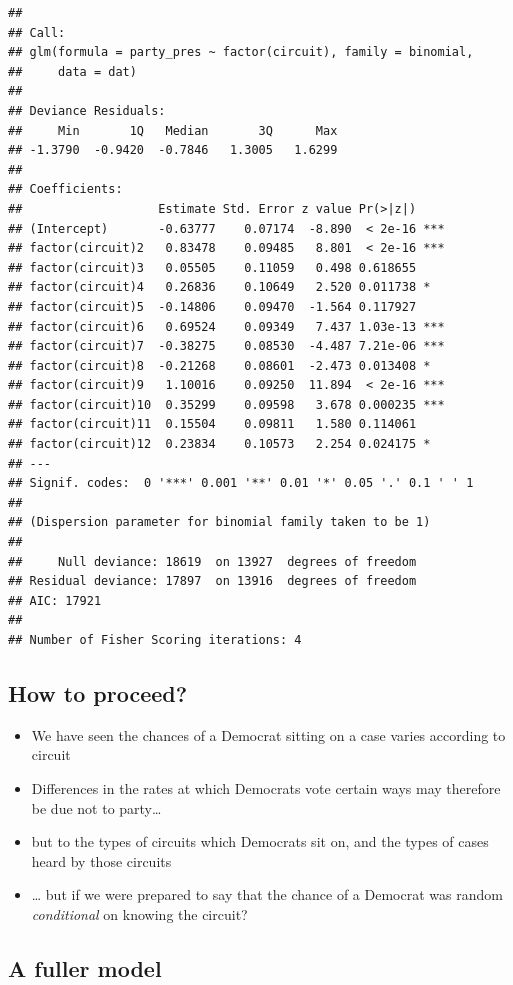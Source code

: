 \documentclass[12pt,twoside]{article}
\providecommand{\tightlist}{%
  \setlength{\itemsep}{0pt}\setlength{\parskip}{0pt}}
\begin{document}
\begin{verbatim}
## 
## Call:
## glm(formula = party_pres ~ factor(circuit), family = binomial, 
##     data = dat)
## 
## Deviance Residuals: 
##     Min       1Q   Median       3Q      Max  
## -1.3790  -0.9420  -0.7846   1.3005   1.6299  
## 
## Coefficients:
##                   Estimate Std. Error z value Pr(>|z|)    
## (Intercept)       -0.63777    0.07174  -8.890  < 2e-16 ***
## factor(circuit)2   0.83478    0.09485   8.801  < 2e-16 ***
## factor(circuit)3   0.05505    0.11059   0.498 0.618655    
## factor(circuit)4   0.26836    0.10649   2.520 0.011738 *  
## factor(circuit)5  -0.14806    0.09470  -1.564 0.117927    
## factor(circuit)6   0.69524    0.09349   7.437 1.03e-13 ***
## factor(circuit)7  -0.38275    0.08530  -4.487 7.21e-06 ***
## factor(circuit)8  -0.21268    0.08601  -2.473 0.013408 *  
## factor(circuit)9   1.10016    0.09250  11.894  < 2e-16 ***
## factor(circuit)10  0.35299    0.09598   3.678 0.000235 ***
## factor(circuit)11  0.15504    0.09811   1.580 0.114061    
## factor(circuit)12  0.23834    0.10573   2.254 0.024175 *  
## ---
## Signif. codes:  0 '***' 0.001 '**' 0.01 '*' 0.05 '.' 0.1 ' ' 1
## 
## (Dispersion parameter for binomial family taken to be 1)
## 
##     Null deviance: 18619  on 13927  degrees of freedom
## Residual deviance: 17897  on 13916  degrees of freedom
## AIC: 17921
## 
## Number of Fisher Scoring iterations: 4
\end{verbatim}

\subsection{How to proceed?}\label{how-to-proceed}

\begin{itemize}
\tightlist
\item
  We have seen the chances of a Democrat sitting on a case varies
  according to circuit
\item
  Differences in the rates at which Democrats vote certain ways may
  therefore be due not to party\ldots{}
\item
  but to the types of circuits which Democrats sit on, and the types of
  cases heard by those circuits
\item
  \ldots{} but if we were prepared to say that the chance of a Democrat
  was random \emph{conditional} on knowing the circuit?
\end{itemize}

\subsection{A fuller model}\label{a-fuller-model}
\end{document}
